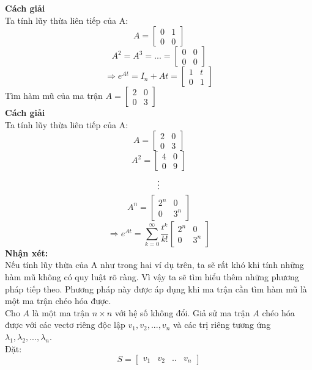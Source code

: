 \textbf{Cách giải}\\
Ta tính lũy thừa liên tiếp của A:\\
$$A=
\begin{bmatrix}
0 & 1\\
0 & 0
\end{bmatrix}$$
$$A^{2}=A^{3}=...=
\begin{bmatrix}
0 & 0\\
0 & 0
\end{bmatrix}$$
$$\Rightarrow e^{At}=I_n+At=
\begin{bmatrix}
1 & t\\
0 & 1
\end{bmatrix}$$
Tìm hàm mũ của ma trận $A=
\begin{bmatrix}
2 & 0\\
0 & 3
\end{bmatrix}$\\
\textbf{Cách giải}\\
Ta tính lũy thừa liên tiếp của A:\\
$$A=
\begin{bmatrix}
2 & 0\\
0 & 3
\end{bmatrix}$$
$$A^{2}=
\begin{bmatrix}
4 & 0\\
0 & 9
\end{bmatrix}$$
$$\vdots\\$$
$$A^{n}=
\begin{bmatrix}
2^{n} & 0\\
0 & 3^{n}
\end{bmatrix}$$
$$\Rightarrow e^{At}=\sum_{k=0}^{\infty}\frac{t^{k}}{k!}\begin{bmatrix}
2^{n} & 0\\
0 & 3^{n}
\end{bmatrix}$$
\textbf{Nhận xét:}\\
Nếu tính lũy thừa của A như trong hai ví dụ trên, ta sẽ rất khó khi tính những hàm mũ không có quy luật rõ ràng. Vì vậy ta sẽ tìm hiểu thêm những phương pháp tiếp theo.
Phương pháp này được áp dụng khi ma trận cần tìm hàm mũ là một ma trận chéo hóa được.\\
Cho $A$ là một ma trận $n \times n$ với hệ số không đổi. Giả sử ma trận $A$ chéo hóa được với các vectơ riêng độc lập $v_1, v_2,...,v_n$ và các trị riêng tương ứng $\lambda_1,\lambda_2,...,\lambda_n$.\\
Đặt:
$$S=
\begin{bmatrix}
    v_1 & v_2 &.. &v_n
\end{bmatrix}$$
